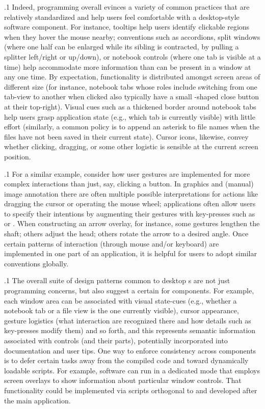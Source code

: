 \documentclass[11pt, twocolumn]{article}
\begin{document}
\p.1{%
Indeed,  programming overall evinces a variety
of common practices that are relatively
standardized and help users feel comfortable
with a desktop-style software component.
For instance, tooltips help users
identify clickable regions when they
hover the mouse nearby; conventions
such as accordions, split windows
(where one half can be enlarged while
its sibling is contracted, by pulling a
splitter left/right or up/down),
or notebook controls (where one tab is
visible at a time) help accommodate
more information than can be present
in a window at any one time. By expectation,
functionality is distributed amongst
screen areas of different size (for
instance, notebook tabs \mdash{} whose
roles include switching from one tab-view
to another when clicked \mdash{} also typically
have a small -shaped close button
at their top-right). Visual cues such as
a thickened border around notebook
tabs help users grasp application state
(e.g., which tab is currently visible)
with little effort (similarly, a common
policy is to append an asterisk to file
names when the files have not been saved
in their current state). Cursor icons,
likewise, convey whether clicking,
dragging, or some other logistic
is sensible at the current screen position.
}%

\p.1{%
For a similar example, consider how
user gestures are implemented for more
complex interactions than just, say, clicking a
button. In  graphics and  (manual) image
annotation there are often multiple
possible interpretations for actions like
dragging the cursor or operating the mouse
wheel; applications often allow users
to specify their intentions by augmenting
their gestures with key-presses such as
 or . When constructing
an arrow overlay, for instance, some gestures
lengthen the shaft; others adjust the head;
others rotate the arrow to a desired angle.
Once certain patterns of interaction (through
mouse and/or keyboard) are implemented in one
part of an application, it is helpful for
users to adopt similar conventions globally.
}%

\p.1{%
The overall suite of design patterns common to
desktop s are not just programming
concerns, but also suggest a certain 
for  components. For example, each
window area can be associated with visual
state-cues (e.g., whether a notebook tab or a
file view is the one currently visible),
cursor appearance, gesture logistics
(what interaction are recognized there and
how details such as key-presses modify them)
and so forth, and this represents semantic
information associated with controls (and their
parts), potentially incorporated into documentation
and user tips. One way to enforce consistency
across  components is to defer certain tasks
away from the compiled code and toward dynamically
loadable scripts. For example, software can run in a
dedicated  mode that employs
screen overlays to show information about
particular window controls. That functionality
could be implemented via  scripts orthogonal
to and developed after the main application.
}%
\end{document}
